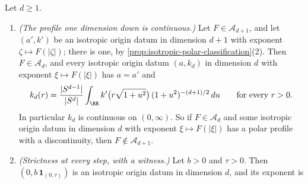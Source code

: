 \begin{proposition}
\label{prop:profile-one-dimension-down}
\leanok
Let $d \ge 1$.
\begin{enumerate}
\item \emph{(The profile one dimension down is continuous.)} Let $F \in \mathcal{A}_{d+1}$, and
let $(a',k')$ be an isotropic origin datum in dimension $d + 1$ with exponent
$\zeta \mapsto F(|\zeta|)$; there is one, by \ref{prop:isotropic-polar-classification}(2). Then
$F \in \mathcal{A}_d$, and every isotropic origin datum
$(a,k_d)$ in dimension $d$ with exponent $\xi \mapsto F(|\xi|)$ has $a = a'$ and
\[
  k_d(r) = \frac{|S^{d-1}|}{|S^{d}|}\int_{\RR} k'\bigl(r\sqrt{1+u^2}\bigr)\,(1+u^2)^{-(d+1)/2}\,du
  \qquad\text{for every } r > 0 .
\]
In particular $k_d$ is continuous on $(0,\infty)$. So if $F \in \mathcal{A}_d$ and some isotropic
origin datum in dimension $d$ with exponent $\xi \mapsto F(|\xi|)$ has a polar profile with a
discontinuity, then $F \notin \mathcal{A}_{d+1}$.
\item \emph{(Strictness at every step, with a witness.)} Let $b > 0$ and $\tau > 0$. Then
$(0, b\,\mathbf 1_{(0,\tau)})$ is an isotropic origin datum in dimension $d$, and its exponent is

\end{enumerate}
\end{proposition}
